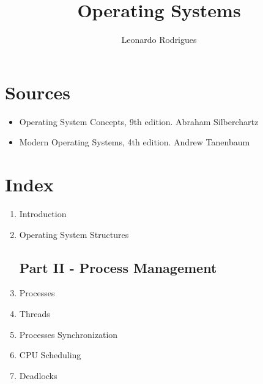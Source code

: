 \documentclass{article}
\author{Leonardo Rodrigues}
\title{Operating Systems}
\begin{document}
\maketitle

\section*{Sources}
\begin{itemize}
\item Operating System Concepts, 9th edition. Abraham Silberchartz
\item Modern Operating Systems, 4th edition. Andrew Tanenbaum
\end{itemize}

\section*{Index}
\begin{enumerate}

\subsection*{Part I - Overview}
\item Introduction
\item Operating System Structures

\subsection*{Part II - Process Management}
\item Processes
\item Threads
\item Processes Synchronization
\item CPU Scheduling
\item Deadlocks
\end{enumerate}
\end{document}
